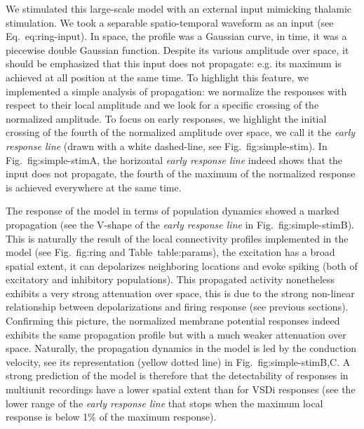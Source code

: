 \documentclass[8pt, colorlinks, a4paper]{article}
\renewcommand\ref{}
\newcommand{\corr}[1]{{#1}}
\begin{document}
\corr{We stimulated this large-scale model with an external input
  mimicking thalamic stimulation. We took a separable spatio-temporal
  waveform as an input (see Eq.~\ref{eq:ring-input}). In space, the
  profile was a Gaussian curve, in time, it was a piecewise double
  Gaussian function. Despite its various amplitude over space, it
  should be emphasized that this input does not propagate: e.g. its
  maximum is achieved at all position at the same time. To highlight
  this feature, we implemented a simple analysis of propagation: we
  normalize the responses with respect to their local amplitude and we
  look for a specific crossing of the normalized amplitude. To focus
  on early responses, we highlight the initial crossing of the fourth
  of the normalized amplitude over space, we call it the \emph{early
    response line} (drawn with a white dashed-line, see
  Fig.~\ref{fig:simple-stim}). In Fig.~\ref{fig:simple-stim}A, the
  horizontal \emph{early response line} indeed shows that the input
  does not propagate, the fourth of the maximum of the normalized
  response is achieved everywhere at the same time.}

\corr{The response of the model in terms of population dynamics showed
  a marked propagation (see the V-shape of the \emph{early response
    line} in Fig.~\ref{fig:simple-stim}B). This is naturally the
  result of the local connectivity profiles implemented in the model
  (see Fig.~\ref{fig:ring} and Table~\ref{table:params}), the
  excitation has a broad spatial extent, it can depolarizes
  neighboring locations and evoke spiking (both of excitatory and
  inhibitory populations). This propagated activity nonetheless
  exhibits a very strong attenuation over space, this is due to the
  strong non-linear relationship between depolarizations and firing
  response (see previous sections). Confirming this picture, the
  normalized membrane potential responses indeed exhibits the same
  propagation profile but with a much weaker attenuation over space.
  Naturally, the propagation dynamics in the model is led by the
  conduction velocity, see its representation (yellow dotted line) in
  Fig.~\ref{fig:simple-stim}B,C. A strong prediction of the model is
  therefore that the detectability of responses in multiunit
  recordings have a lower spatial extent than for VSDi responses (see
  the lower range of the \emph{early response line} that stops when
  the maximum local response is below 1\% of the maximum response).}
\end{document}
